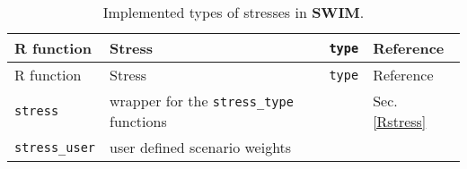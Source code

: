 \documentclass[
]{article}
\begin{document}
\begin{longtable}[]{@{}llll@{}}
\caption{\label{tab:Rfunstress} Implemented types of stresses in \textbf{SWIM}.}\tabularnewline
\toprule
\begin{minipage}[b]{0.20\columnwidth}\raggedright
R function\strut
\end{minipage} & \begin{minipage}[b]{0.39\columnwidth}\raggedright
Stress\strut
\end{minipage} & \begin{minipage}[b]{0.09\columnwidth}\raggedright
\texttt{type}\strut
\end{minipage} & \begin{minipage}[b]{0.20\columnwidth}\raggedright
Reference\strut
\end{minipage}\tabularnewline
\midrule
\endfirsthead
\toprule
\begin{minipage}[b]{0.20\columnwidth}\raggedright
R function\strut
\end{minipage} & \begin{minipage}[b]{0.39\columnwidth}\raggedright
Stress\strut
\end{minipage} & \begin{minipage}[b]{0.09\columnwidth}\raggedright
\texttt{type}\strut
\end{minipage} & \begin{minipage}[b]{0.20\columnwidth}\raggedright
Reference\strut
\end{minipage}\tabularnewline
\midrule
\endhead
\begin{minipage}[t]{0.20\columnwidth}\raggedright
\texttt{stress}\strut
\end{minipage} & \begin{minipage}[t]{0.39\columnwidth}\raggedright
wrapper for the \texttt{stress\_type} functions\strut
\end{minipage} & \begin{minipage}[t]{0.09\columnwidth}\raggedright
\strut
\end{minipage} & \begin{minipage}[t]{0.20\columnwidth}\raggedright
Sec. \ref{Rstress}\strut
\end{minipage}\tabularnewline
\begin{minipage}[t]{0.20\columnwidth}\raggedright
\texttt{stress\_user}\strut
\end{minipage} & \begin{minipage}[t]{0.39\columnwidth}\raggedright
user defined scenario weights\strut
\end{minipage} & \begin{minipage}[t]{0.09\columnwidth}\raggedright

\end{minipage}
\end{longtable}
\end{document}
